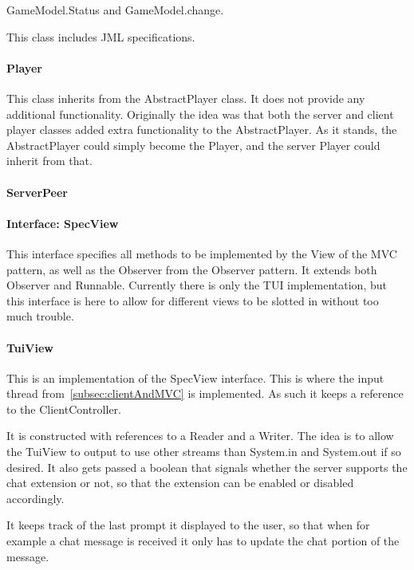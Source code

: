 \documentclass[12pt, letterpaper]{article}
\begin{document}
    GameModel.Status and GameModel.change.

    This class includes JML specifications.

    \paragraph{Player}
    This class inherits from the AbstractPlayer class.
    It does not provide any additional functionality.
    Originally the idea was that both the server and client player classes added extra functionality to the
    AbstractPlayer.
    As it stands, the AbstractPlayer could simply become the Player, and the server Player could inherit from that.

    \paragraph{ServerPeer}



    \paragraph{Interface: SpecView}
    This interface specifies all methods to be implemented by the View of the MVC pattern, as well as the Observer
    from the Observer pattern.
    It extends both Observer and Runnable.
    Currently there is only the TUI implementation, but this interface is here to allow for different views to be
    slotted in without too much trouble.

    \paragraph{TuiView}
    This is an implementation of the SpecView interface.
    This is where the input thread from~\autoref{subsec:clientAndMVC} is implemented.
    As such it keeps a reference to the ClientController.

    It is constructed with references to a Reader and a Writer.
    The idea is to allow the TuiView to output to use other streams than System.in and System.out if so desired.
    It also gets passed a boolean that signals whether the server supports the chat extension or not,
    so that the extension can be enabled or disabled accordingly.

    It keeps track of the last prompt it displayed to the user, so that when for example a chat message is received
    it only has to update the chat portion of the message.
\end{document}
